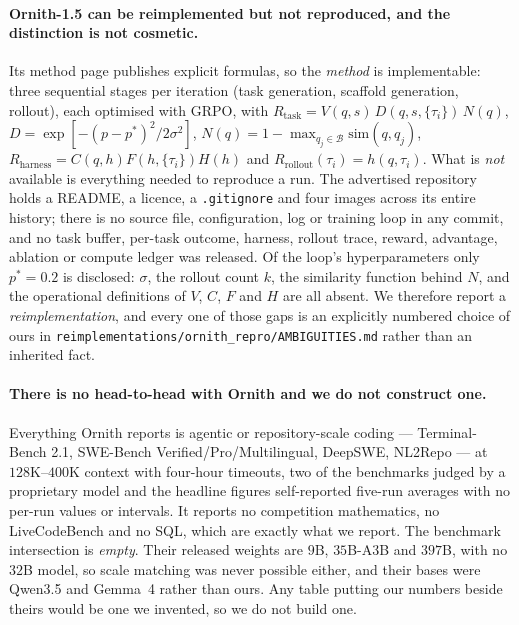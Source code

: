 \paragraph{Ornith-1.5 can be reimplemented but not reproduced, and the distinction is
not cosmetic.} Its method page publishes explicit formulas, so the \emph{method} is
implementable: three sequential stages per iteration (task generation, scaffold
generation, rollout), each optimised with GRPO, with
$R_{\mathrm{task}}=V(q,s)\,D(q,s,\{\tau_i\})\,N(q)$,
$D=\exp[-(p-p^*)^2/2\sigma^2]$,
$N(q)=1-\max_{q_j\in\mathcal{B}}\mathrm{sim}(q,q_j)$,
$R_{\mathrm{harness}}=C(q,h)F(h,\{\tau_i\})H(h)$ and
$R_{\mathrm{rollout}}(\tau_i)=h(q,\tau_i)$. What is \emph{not} available is everything
needed to reproduce a run. The advertised repository holds a README, a licence, a
\texttt{.gitignore} and four images across its entire history; there is no source file,
configuration, log or training loop in any commit, and no task buffer, per-task outcome,
harness, rollout trace, reward, advantage, ablation or compute ledger was released. Of
the loop's hyperparameters only $p^*=0.2$ is disclosed: $\sigma$, the rollout count $k$,
the similarity function behind $N$, and the operational definitions of $V$, $C$, $F$ and
$H$ are all absent. We therefore report a \emph{reimplementation}, and every one of those
gaps is an explicitly numbered choice of ours in
\texttt{reimplementations/ornith\_repro/AMBIGUITIES.md} rather than an inherited fact.

\paragraph{There is no head-to-head with Ornith and we do not construct one.} Everything
Ornith reports is agentic or repository-scale coding --- Terminal-Bench 2.1, SWE-Bench
Verified/Pro/Multilingual, DeepSWE, NL2Repo --- at $128$K--$400$K context with four-hour
timeouts, two of the benchmarks judged by a proprietary model and the headline figures
self-reported five-run averages with no per-run values or intervals. It reports no
competition mathematics, no LiveCodeBench and no SQL, which are exactly what we report.
The benchmark intersection is \emph{empty}. Their released weights are $9$B, $35$B-A3B
and $397$B, with no $32$B model, so scale matching was never possible either, and their
bases were Qwen3.5 and Gemma~4 rather than ours. Any table putting our numbers beside
theirs would be one we invented, so we do not build one.

